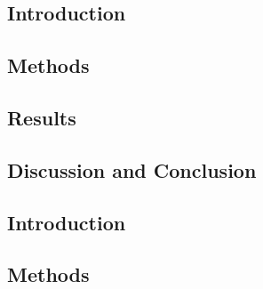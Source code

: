         \blindtext
        
        \subsection{Introduction} \label{extension_of_static_pca_based_data_driven_surrogate_signal_extraction_to_dynamic_pet_introduction}
        
        \subsection{Methods} \label{extension_of_static_pca_based_data_driven_surrogate_signal_extraction_to_dynamic_pet_methods}
            \blindtext
            
        \subsection{Results} \label{extension_of_static_pca_based_data_driven_surrogate_signal_extraction_to_dynamic_pet_results}
            \blindtext
            
        \subsection{Discussion and Conclusion} \label{extension_of_static_pca_based_data_driven_surrogate_signal_extraction_to_dynamic_pet_discussion_and_conclusion}
            \blindtext
    
        \blindtext
        
        \subsection{Introduction} \label{feasibility_of_neural_network_based_data_driven_surrogate_signal_extraction_methods_for_dynamic_pet_introduction}
        
        \subsection{Methods} \label{feasibility_of_neural_network_based_data_driven_surrogate_signal_extraction_methods_for_dynamic_pet_methods}
            \blindtext
            
